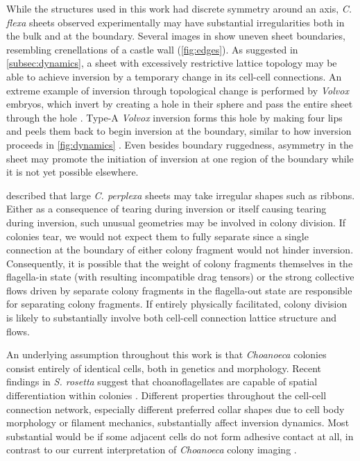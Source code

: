 While the structures used in this work had discrete symmetry around an axis, \textit{C. flexa} sheets observed experimentally may have substantial irregularities both in the bulk and at the boundary. 
Several images in \citet{brunet2019} show uneven sheet boundaries, resembling crenellations of a castle wall (\cref{fig:edges}).
As suggested in \cref{subsec:dynamics}, a sheet with excessively restrictive lattice topology may be able to achieve inversion by a temporary change in its cell-cell connections.
An extreme example of inversion through topological change is performed by \textit{Volvox} embryos, which invert by creating a hole in their sphere and pass the entire sheet through the hole \citep{hohn2015}.
Type-A \textit{Volvox} inversion forms this hole by making four lips and peels them back to begin inversion at the boundary, similar to how inversion proceeds in \cref{fig:dynamics} \citep{viamontes1977}.
Even besides boundary ruggedness, asymmetry in the sheet may promote the initiation of inversion at one region of the boundary while it is not yet possible elsewhere.

\citet{leadbeater1983} described that large \textit{C. perplexa} sheets may take irregular shapes such as ribbons. 
Either as a consequence of tearing during inversion or itself causing tearing during inversion, such unusual geometries may be involved in colony division.
If colonies tear, we would not expect them to fully separate since a single connection at the boundary of either colony fragment would not hinder inversion. 
Consequently, it is possible that the weight of colony fragments themselves in the flagella-in state (with resulting incompatible drag tensors) or the strong collective flows driven by separate colony fragments in the flagella-out state are responsible for separating colony fragments.
If entirely physically facilitated, colony division is likely to substantially involve both cell-cell connection lattice structure and flows.

An underlying assumption throughout this work is that \textit{Choanoeca} colonies consist entirely of identical cells, both in genetics and morphology.
Recent findings in \textit{S. rosetta} suggest that choanoflagellates are capable of spatial differentiation within colonies \citep{laundon2019,naumann2019}.
Different properties throughout the cell-cell connection network, especially different preferred collar shapes due to cell body morphology or filament mechanics, substantially affect inversion dynamics.
Most substantial would be if some adjacent cells do not form adhesive contact at all, in contrast to our current interpretation of \textit{Choanoeca} colony imaging \citep{brunet2019}.


